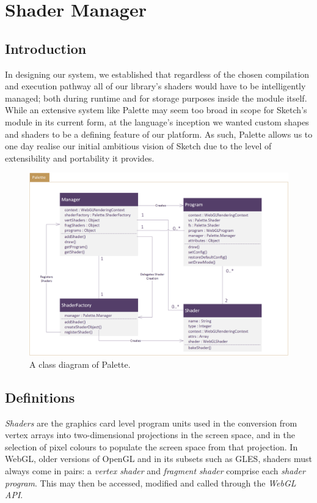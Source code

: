 \documentclass{l3proj}
\begin{document}
\section{Shader Manager}
\label{arch-shad}

\subsection{Introduction}
\label{arch-shad-intro}
In designing our system, we established that regardless of the chosen compilation and execution pathway all of our library's shaders would have to be intelligently managed; both during runtime and for storage purposes inside the module itself. While an extensive system like Palette may seem too broad in scope for Sketch's module in its current form, at the language's inception we wanted custom shapes and shaders to be a defining feature of our platform. As such, Palette allows us to one day realise our initial ambitious vision of Sketch due to the level of extensibility and portability it provides.

\begin{figure}[!h]
\centering
\includegraphics[width=\textwidth]{images/Palette-UML}
\caption{A class diagram of Palette.}
\label{fig:palette-uml}
\end{figure}

\subsection{Definitions}
\label{arch-shad-def}
\textit{Shaders} are the graphics card level program units used in the conversion from vertex arrays into two-dimensional projections in the screen space, and in the selection of pixel colours to populate the screen space from that projection. In WebGL, older versions of OpenGL and in its subsets such as GLES, shaders must always come in pairs: a \textit{vertex shader} and \textit{fragment shader} comprise each \textit{shader program}. This may then be accessed, modified and called through the \textit{WebGL API}.
\end{document}

